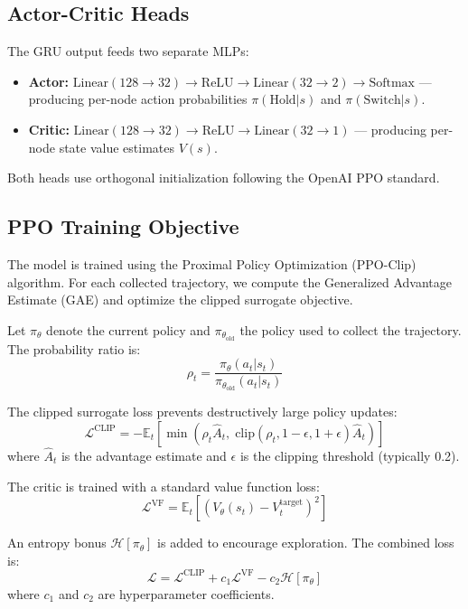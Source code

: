 \documentclass[12pt, onecolumn]{IEEEtran}
\begin{document}
\subsection{Actor-Critic Heads}
The GRU output feeds two separate MLPs:
\begin{itemize}
    \item \textbf{Actor:} $\text{Linear}(128 \to 32) \to \text{ReLU} \to \text{Linear}(32 \to 2) \to \text{Softmax}$ — producing per-node action probabilities $\pi(\text{Hold} | s)$ and $\pi(\text{Switch} | s)$.
    \item \textbf{Critic:} $\text{Linear}(128 \to 32) \to \text{ReLU} \to \text{Linear}(32 \to 1)$ — producing per-node state value estimates $V(s)$.
\end{itemize}
Both heads use orthogonal initialization following the OpenAI PPO standard.

\subsection{PPO Training Objective}
The model is trained using the Proximal Policy Optimization (PPO-Clip) algorithm. For each collected trajectory, we compute the Generalized Advantage Estimate (GAE) and optimize the clipped surrogate objective.

Let $\pi_{\theta}$ denote the current policy and $\pi_{\theta_{\text{old}}}$ the policy used to collect the trajectory. The probability ratio is:
\begin{equation}
    \rho_t = \frac{\pi_{\theta}(a_t | s_t)}{\pi_{\theta_{\text{old}}}(a_t | s_t)}
\end{equation}

The clipped surrogate loss prevents destructively large policy updates:
\begin{equation}
    \mathcal{L}^{\text{CLIP}} = -\mathbb{E}_t \left[ \min\!\left( \rho_t \hat{A}_t, \; \text{clip}(\rho_t, 1{-}\epsilon, 1{+}\epsilon) \hat{A}_t \right) \right]
\end{equation}
where $\hat{A}_t$ is the advantage estimate and $\epsilon$ is the clipping threshold (typically 0.2).

The critic is trained with a standard value function loss:
\begin{equation}
    \mathcal{L}^{\text{VF}} = \mathbb{E}_t \left[ \left( V_{\theta}(s_t) - V^{\text{target}}_t \right)^2 \right]
\end{equation}

An entropy bonus $\mathcal{H}[\pi_{\theta}]$ is added to encourage exploration. The combined loss is:
\begin{equation}
    \mathcal{L} = \mathcal{L}^{\text{CLIP}} + c_1 \mathcal{L}^{\text{VF}} - c_2 \mathcal{H}[\pi_{\theta}]
\end{equation}
where $c_1$ and $c_2$ are hyperparameter coefficients.
\end{document}
